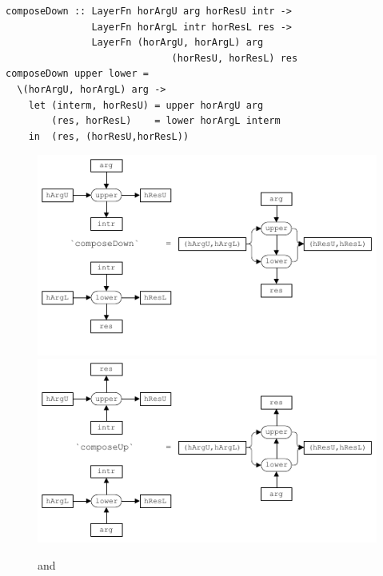 \documentclass[preprint,natbib]{sigplanconf}
\begin{document}
\begin{small}
\begin{verbatim}
composeDown :: LayerFn horArgU arg horResU intr ->
               LayerFn horArgL intr horResL res ->
               LayerFn (horArgU, horArgL) arg 
                             (horResU, horResL) res
composeDown upper lower = 
  \(horArgU, horArgL) arg ->                                           
    let (interm, horResU) = upper horArgU arg
        (res, horResL)    = lower horArgL interm            
    in  (res, (horResU,horResL))
\end{verbatim}
\end{small}

\begin{figure}
\includegraphics[width=\columnwidth]{images/ComposeDown}
\includegraphics[width=\columnwidth]{images/ComposeUp}
\caption{ and } \label{composeDownUp} 
\end{figure}


\end{document}
